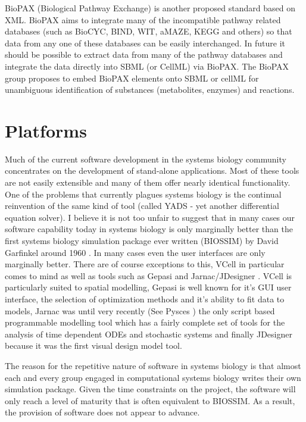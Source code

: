 \documentclass[12pt]{article}
\begin{document}
{BioPAX (Biological Pathway Exchange) is another proposed standard
based on XML. BioPAX aims to integrate many of the incompatible
pathway related databases (such as BioCYC, BIND, WIT, aMAZE, KEGG
and others) so that data from any one of these databases can be easily
interchanged. In future it should be possible to extract data from
many of the pathway databases and integrate the data directly into
SBML (or CellML) via BioPAX. The BioPAX group proposes to embed BioPAX
elements onto SBML or cellML for unambiguous identification of
substances (metabolites, enzymes) and reactions.


\section{Platforms}

Much of the current software development in the systems biology
community concentrates on the development of stand-alone
applications. Most of these tools are not easily extensible and
many of them offer nearly identical functionality. One of the
problems that currently plagues systems biology is the continual
reinvention of the same kind of tool (called YADS - yet another
differential equation solver). I believe it is not too unfair to
suggest that in many cases our software capability today in
systems biology is only marginally better than the first systems
biology simulation package ever written (BIOSSIM) by David
Garfinkel around 1960 \cite{Ga68}. In many cases even the user
interfaces are only marginally better. There are of course
exceptions to this, VCell \cite{VCELL} in particular comes to mind as
well as tools such as Gepasi \cite{Gepasi:1993} and Jarnac/JDesigner \cite{Sauro:Omics}.
VCell is particularly suited to spatial modelling, Gepasi is well known for it's
GUI user interface, the selection of optimization methods and it's ability to fit data to models, Jarnac was until very recently (See Pysces \cite{Pysces2005}) the only script based programmable modelling tool which has a fairly complete set of tools for the analysis of time dependent ODEs and stochastic systems and finally JDesigner because it was the first visual design model tool.

The reason for the repetitive nature of software in systems biology is that almost each and every group engaged in computational systems biology writes their own simulation package. Given the time constraints on the project, the software will only reach a level
of maturity that is often equivalent to BIOSSIM. As a result, the
provision of software does not appear to advance.

}
\end{document}
